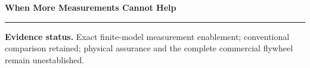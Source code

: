 \documentclass[10pt,letterpaper]{article}
\begin{document}
{\sffamily\LARGE\bfseries\color{ink}When More Measurements Cannot Help\par}
\vspace{5pt}{\small Source-bound engineering study and conditional commercial execution\par}
\vspace{9pt}\hrule\vspace{9pt}
{\small\textbf{Evidence status.} Exact finite-model measurement enablement; conventional comparison retained; physical assurance and the complete commercial flywheel remain unestablished.}\vspace{4pt}
\end{document}
